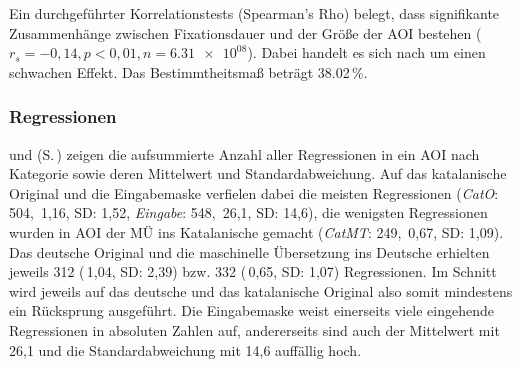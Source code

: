 
Ein durchgeführter Korrelationstests (Spearman’s Rho) belegt, dass signifikante Zusammenhänge zwischen Fixationsdauer und der Größe der AOI bestehen ($r_{s} = -0,14, p < 0,01, n = \num{6,31e08}$). Dabei handelt es sich nach \citet{cohen_power_1992} um einen schwachen Effekt. Das Bestimmtheitsmaß beträgt 38.02\,\%.


\subsubsection{Regressionen}
\label{K6:Subsubsec:regression:catde}



\label{K6:para:regin:catde}


 und  (S.\,\pageref{K6:tab:CatDe:mean-sd-regin}) zeigen die aufsummierte Anzahl aller Regressionen in ein AOI nach Kategorie sowie deren Mittelwert und Standardabweichung. Auf das katalanische Original und die Eingabemaske verfielen dabei die meisten Regressionen (\emph{CatO}: 504, \diameter\,1,16, SD: 1,52, \emph{Eingabe}: 548, \diameter\,26,1, SD: 14,6), die wenigsten Regressionen wurden in AOI der MÜ ins Katalanische gemacht (\emph{CatMT}: 249, \diameter\,0,67, SD: 1,09). Das deutsche Original und die maschinelle Übersetzung ins Deutsche erhielten jeweils 312 (\diameter\,1,04, SD: 2,39) bzw. 332 (\diameter\,0,65, SD: 1,07) Regressionen. Im Schnitt wird jeweils auf das deutsche und das katalanische Original also somit mindestens ein Rücksprung ausgeführt. Die Eingabemaske weist einerseits viele eingehende Regressionen in absoluten Zahlen auf, andererseits sind auch der Mittelwert mit 26,1 und die Standardabweichung mit 14,6 auffällig hoch.

